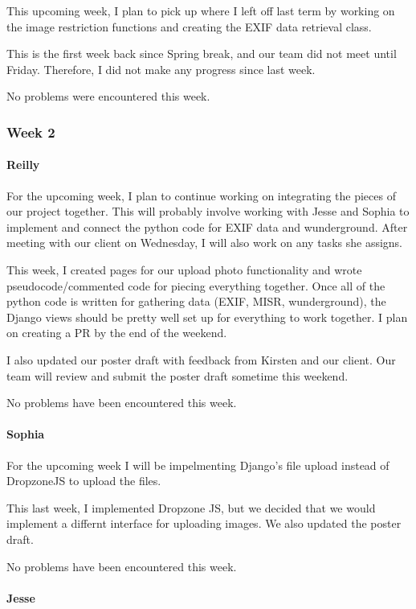 \documentclass[onecolumn, draftclsnofoot,10pt, compsoc]{IEEEtran}
\begin{document}
\begin{flushleft}
This upcoming week, I plan to pick up where I left off last term by working on the image restriction functions and creating the EXIF data retrieval class.
 
 
This is the first week back since Spring break, and our team did not meet until Friday. Therefore, I did not make any progress since last week.
 
 
No problems were encountered this week.
 
\subsubsection{Week 2}
\paragraph{Reilly}
 
For the upcoming week, I plan to continue working on integrating the pieces of our project together. This will probably involve working with Jesse and Sophia to implement and connect the python code for EXIF data and wunderground. After meeting with our client on Wednesday, I will also work on any tasks she assigns.
 
 
This week, I created pages for our upload photo functionality and wrote pseudocode/commented code for piecing everything together. Once all of the python code is written for gathering data (EXIF, MISR, wunderground), the Django views should be pretty well set up for everything to work together. I plan on creating a PR by the end of the weekend.
 
I also updated our poster draft with feedback from Kirsten and our client. Our team will review and submit the poster draft sometime this weekend.
 
 
No problems have been encountered this week.
 
\paragraph{Sophia}
 
For the upcoming week I will be impelmenting Django's file upload instead of DropzoneJS to upload the files.
 
 
This last week, I implemented Dropzone JS, but we decided that we would implement a differnt interface for uploading images. We also updated the poster draft.
 
 
No problems have been encountered this week.
 
\paragraph{Jesse}
 

\end{flushleft}
\end{document}
